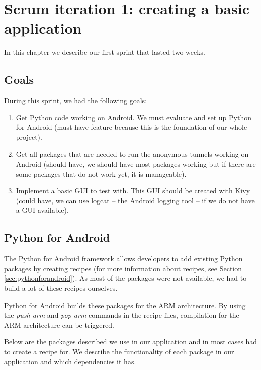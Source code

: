 \chapter{Scrum iteration 1: creating a basic application}
\label{cpt:iteration1}
	In this chapter we describe our first sprint that lasted two weeks.

	\section{Goals}
		During this sprint, we had the following goals:
	
		\begin{enumerate}
			\item Get Python code working on Android. We must evaluate and set up Python for Android (must have feature because this is the foundation of our whole project).
			\item Get all packages that are needed to run the anonymous tunnels working on Android (should have, we should have most packages working but if there are some packages that do not work yet, it is manageable).
			\item Implement a basic GUI to test with. This GUI should be created with Kivy (could have, we can use logcat -- the Android logging tool -- if we do not have a GUI available).
		\end{enumerate}
	
	\section{Python for Android}
		The Python for Android framework allows developers to add existing Python packages by creating recipes (for more information about recipes, see Section \ref{sec:pythonforandroid}). As most of the packages were not available, we had to build a lot of these recipes ourselves.
	
		Python for Android builds these packages for the ARM architecture. By using the \emph{push arm} and \emph{pop arm} commands in the recipe files, compilation for the ARM architecture can be triggered.
	
		Below are the packages described we use in our application and in most cases had to create a recipe for. We describe the functionality of each package in our application and which dependencies it has.
	
